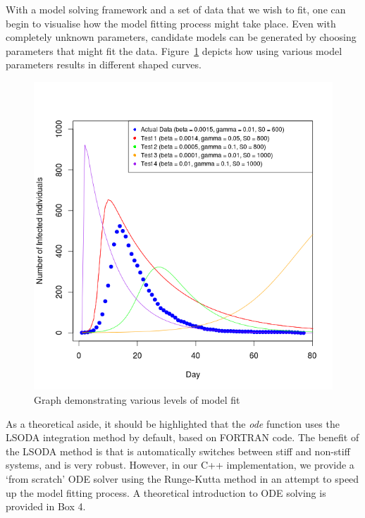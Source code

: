   
With a model solving framework and a set of data that we wish to fit,
one can begin to visualise how the model fitting process might take
place. Even with completely unknown parameters, candidate models can
be generated by choosing parameters that might fit the
data. Figure~\ref{fig:sircurves} depicts how using various model
parameters results in different
shaped curves. 

\begin{center}
\begin{figure}[ht!]

\includegraphics[width=15cm]{Rplot01.png}
\caption{Graph demonstrating various levels of model fit}
\label{fig:sircurves}
\end{figure}  
\end{center}

As a theoretical aside, it should be highlighted that the
\emph{ode} function uses the LSODA integration method by default,
based on FORTRAN code. The benefit of the LSODA method is that is
automatically switches between stiff and non-stiff systems, and is
very robust. However, in our C++ implementation, we provide a `from
scratch' ODE solver using the Runge-Kutta method in an attempt to
speed up the model fitting process. A theoretical introduction to ODE
solving is provided in Box 4.  

